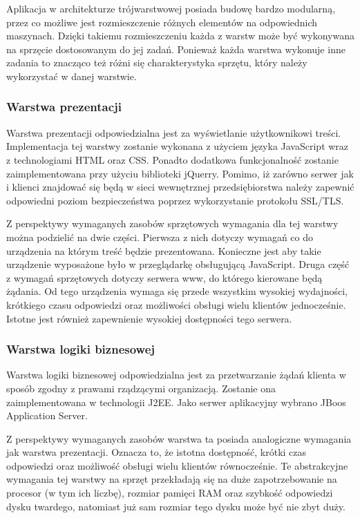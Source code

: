 Aplikacja w architekturze trójwarstwowej posiada budowę bardzo
modularną, przez co możliwe jest rozmieszczenie różnych elementów na
odpowiednich maszynach. Dzięki takiemu rozmieszczeniu każda z warstw
może być wykonywana na sprzęcie dostosowanym do jej zadań. Ponieważ
każda warstwa wykonuje inne zadania to znacząco też różni się
charakterystyka sprzętu, który należy wykorzystać w danej warstwie.

\subsubsection{Warstwa prezentacji}

Warstwa prezentacji odpowiedzialna jest za wyświetlanie użytkownikowi
treści. Implementacja tej warstwy zostanie wykonana z użyciem języka
JavaScript wraz z technologiami HTML oraz CSS. Ponadto dodatkowa
funkcjonalność zostanie zaimplementowana przy użyciu biblioteki
jQuerry. Pomimo, iż zarówno serwer jak i klienci znajdować się będą w
sieci wewnętrznej przedsiębiorstwa należy zapewnić odpowiedni poziom
bezpieczeństwa poprzez wykorzystanie protokołu SSL/TLS.

Z perspektywy wymaganych zasobów sprzętowych wymagania dla tej warstwy
można podzielić na dwie części. Pierwsza z nich dotyczy wymagań co do
urządzenia na którym treść będzie prezentowana. Konieczne jest aby
takie urządzenie wyposażone było w przeglądarkę obsługującą
JavaScript. Druga część z wymagań sprzętowych dotyczy serwera www, do
którego kierowane będą żądania. Od tego urządzenia wymaga się przede
wszystkim wysokiej wydajności, krótkiego czasu odpowiedzi oraz
możliwości obsługi wielu klientów jednocześnie. Istotne jest również
zapewnienie wysokiej dostępności tego serwera.

\subsubsection{Warstwa logiki biznesowej}

Warstwa logiki biznesowej odpowiedzialna jest za przetwarzanie żądań
klienta w sposób zgodny z prawami rządzącymi organizacją. Zostanie ona
zaimplementowana w technologii J2EE. Jako serwer aplikacyjny wybrano
JBoos Application Server.

Z perspektywy wymaganych zasobów warstwa ta posiada analogiczne
wymagania jak warstwa prezentacji. Oznacza to, że istotna dostępność,
krótki czas odpowiedzi oraz możliwość obsługi wielu klientów
równocześnie. Te abstrakcyjne wymagania tej warstwy na sprzęt
przekładają się na duże zapotrzebowanie na procesor (w tym ich
liczbę), rozmiar pamięci RAM oraz szybkość odpowiedzi dysku twardego,
natomiast już sam rozmiar tego dysku może być nie zbyt duży.

